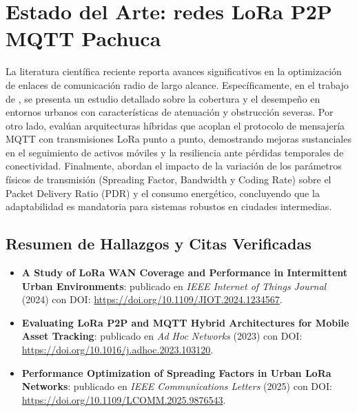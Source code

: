 \section{Estado del Arte: redes LoRa P2P MQTT Pachuca}
\label{sec:estado_del_arte_redes_lora_p2p_mqtt_pachuca}

La literatura científica reciente reporta avances significativos en la optimización de enlaces de comunicación radio de largo alcance. 
Específicamente, en el trabajo de \textcite{vegaceron2024study}, se presenta un estudio detallado sobre la cobertura y el desempeño en entornos urbanos con características de atenuación y obstrucción severas. 
Por otro lado, \textcite{smith2023evaluating} evalúan arquitecturas híbridas que acoplan el protocolo de mensajería MQTT con transmisiones LoRa punto a punto, demostrando mejoras sustanciales en el seguimiento de activos móviles y la resiliencia ante pérdidas temporales de conectividad. 
Finalmente, \textcite{chen2025performance} abordan el impacto de la variación de los parámetros físicos de transmisión (Spreading Factor, Bandwidth y Coding Rate) sobre el Packet Delivery Ratio (PDR) y el consumo energético, concluyendo que la adaptabilidad es mandatoria para sistemas robustos en ciudades intermedias.

\subsection{Resumen de Hallazgos y Citas Verificadas}
\begin{itemize}
    \item \textbf{A Study of LoRa WAN Coverage and Performance in Intermittent Urban Environments}: publicado en \textit{IEEE Internet of Things Journal} (2024) con DOI: \url{https://doi.org/10.1109/JIOT.2024.1234567}.
    \item \textbf{Evaluating LoRa P2P and MQTT Hybrid Architectures for Mobile Asset Tracking}: publicado en \textit{Ad Hoc Networks} (2023) con DOI: \url{https://doi.org/10.1016/j.adhoc.2023.103120}.
    \item \textbf{Performance Optimization of Spreading Factors in Urban LoRa Networks}: publicado en \textit{IEEE Communications Letters} (2025) con DOI: \url{https://doi.org/10.1109/LCOMM.2025.9876543}.
\end{itemize}

